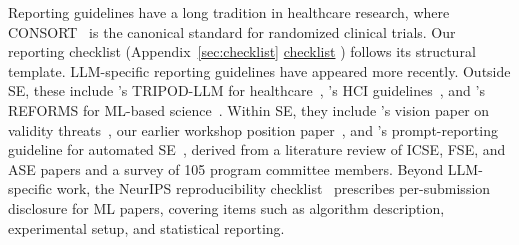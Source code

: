 
Reporting guidelines have a long tradition in healthcare research, where CONSORT~\cite{Schulz2010} is the canonical standard for randomized clinical trials. Our reporting checklist (\ifpaper Appendix~\ref{sec:checklist} \else \href{/checklist/}{checklist} \fi) follows its structural template. LLM-specific reporting guidelines have appeared more recently. Outside SE, these include \citeauthor{Gallifant2025}'s TRIPOD-LLM for healthcare~\cite{Gallifant2025}, \citeauthor{DBLP:conf/chi/NavarroSA26}'s HCI guidelines~\cite{DBLP:conf/chi/NavarroSA26}, and \citeauthor{Kapoor2024REFORMS}'s REFORMS for ML-based science~\cite{Kapoor2024REFORMS}. Within SE, they include \citeauthor{DBLP:conf/icse/SallouDP24}'s vision paper on validity threats~\cite{DBLP:conf/icse/SallouDP24}, our earlier workshop position paper~\cite{DBLP:conf/wsese/0001BFB25}, and \citeauthor{DBLP:journals/corr/abs-2601-01954}'s prompt-reporting guideline for automated SE~\cite{DBLP:journals/corr/abs-2601-01954}, derived from a literature review of ICSE, FSE, and ASE papers and a survey of 105 program committee members. Beyond LLM-specific work, the NeurIPS reproducibility checklist~\cite{DBLP:journals/jmlr/PineauVSLBdFL21} prescribes per-submission disclosure for ML papers, covering items such as algorithm description, experimental setup, and statistical reporting.

